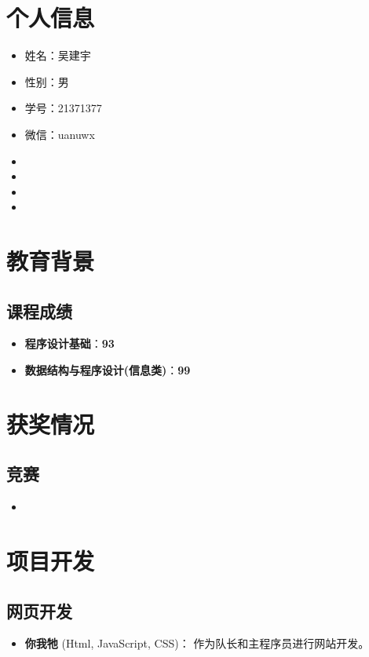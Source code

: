 \documentclass{resume}
\begin{document}

\section{个人信息}
\begin{itemize}
\item{姓名}：吴建宇
\item{性别}：男
\item{学号}：21371377
\item{微信}：uanuwx
\item {}
\item {}
\item {}
\item {}
\end{itemize}

\section{教育背景}
\subsection{\textbf{课程成绩}}
\begin{itemize}
  \item \textbf{程序设计基础}：\textbf{93}
  \item \textbf{数据结构与程序设计(信息类)}：\textbf{99}
\end{itemize}

\section{获奖情况}
\subsection{\textbf{竞赛}}
\begin{itemize}
  \item {}
\end{itemize}

\section{项目开发}
\subsection{\textbf{网页开发}}
\begin{itemize}
  \item \textbf{你我牠} (Html, JavaScript, CSS)：
        作为队长和主程序员进行网站开发。
\end{itemize}
\end{document}
